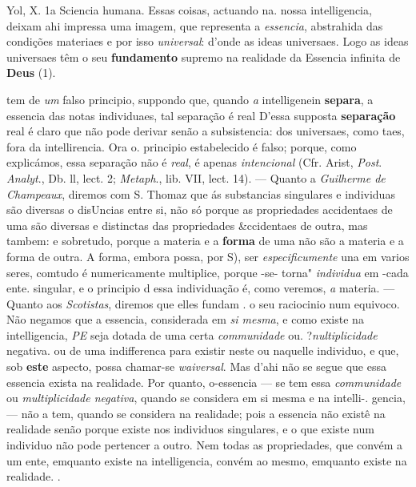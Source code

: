 Yol, X. 1a   Sciencia humana. Essas coisas, actuando na. nossa intelligencia, deixam ahi impressa uma imagem, que representa a \emph{essencia}, abstrahida das condições materiaes e por isso \emph{universal}: d'onde as ideas universaes. Logo as ideas universaes têm o seu \textbf{fundamento} supremo na realidade da Essencia infinita de \textbf{Deus} (1).

tem de \emph{um} falso principio, suppondo que, quando \emph{a} intelligenein \textbf{separa}, a essencia das notas individuaes, tal separação é real D'essa supposta \textbf{separação} real é claro que não pode derivar senão a subsistencia: dos universaes, como taes, fora da intellirencia. Ora o. principio estabelecido é falso; porque, como explicámos, essa separação não é \emph{real}, é apenas \emph{intencional} (Cfr. Arist, \emph{Post}. \emph{Analyt}., Db. ll, lect. 2; \emph{Metaph}., lib. VII, lect. 14). --- Quanto a \emph{Guilherme de Champeaux}, diremos com S. Thomaz que ás substancias singulares e individuas são diversas o disUncias entre si, não só porque as propriedades accidentaes de uma são diversas e distinctas das propriedades \&ccidentaes de outra, mas tambem: e sobretudo, porque a materia e a \textbf{forma} de uma não são a materia e a forma de outra. A forma, embora possa, por S), ser \emph{especificumente} una em varios seres, comtudo é numericamente multiplice, porque -se- torna" \emph{individua} em -cada ente. singular, e o principio d essa individuação é, como veremos, \emph{a} materia. --- Quanto aos \emph{Scotistas}, diremos que elles fundam . o seu raciocinio num equivoco. Não negamos que a essencia, considerada em \emph{si mesma}, e como existe na intelligencia, \emph{PE} seja dotada de uma certa \emph{communidade} ou. ?\emph{nultiplicidade} negativa. ou de uma indifferenca para existir neste ou naquelle individuo, e que, sob \textbf{este} aspecto, possa chamar-se \emph{waiversal}. Mas d'ahi não se segue que essa essencia exista na realidade. Por quanto, o-essencia --- se tem essa \emph{communidade} ou \emph{multiplicidade negativa}, quando se considera em si mesma e na intelli-. gencia, --- não a tem, quando se considera na realidade; pois a essencia não existê na realidade senão porque existe nos individuos singulares, e o que existe num individuo não pode pertencer a outro. Nem todas as propriedades, que convém a um ente, emquanto existe na intelligencia, convém ao mesmo, emquanto existe na realidade. .

